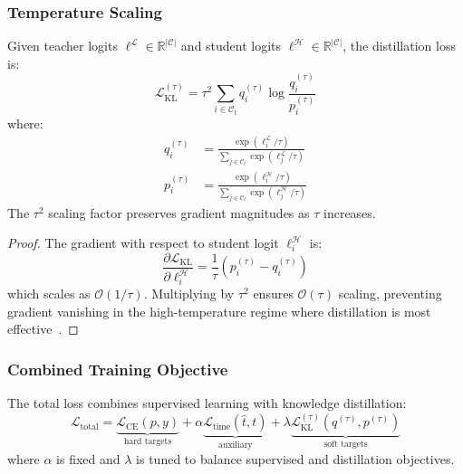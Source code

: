 \subsubsection{Temperature Scaling}

\begin{theorem}
    \label{thm:temp-scaling}
    Given teacher logits $\boldsymbol{\ell}^{\mathcal{L}} \in \mathbb{R}^{|\mathcal{C}|}$ and student logits $\boldsymbol{\ell}^{\mathcal{H}} \in \mathbb{R}^{|\mathcal{C}|}$, the distillation loss is:
    \begin{equation}
        \mathcal{L}_{\text{KL}}^{(\tau)} = \tau^2 \sum_{i \in \mathcal{C}_t} q_i^{(\tau)} \log \frac{q_i^{(\tau)}}{p_i^{(\tau)}}
        \label{eq:distill-loss}
    \end{equation}
    where:
    \begin{align}
        q_i^{(\tau)} & = \frac{\exp(\ell_i^{\mathcal{L}} / \tau)}{\sum_{j \in \mathcal{C}_t} \exp(\ell_j^{\mathcal{L}} / \tau)} \label{eq:teacher-dist} \\
        p_i^{(\tau)} & = \frac{\exp(\ell_i^{\mathcal{H}} / \tau)}{\sum_{j \in \mathcal{C}_t} \exp(\ell_j^{\mathcal{H}} / \tau)} \label{eq:student-dist}
    \end{align}
    The $\tau^2$ scaling factor preserves gradient magnitudes as $\tau$ increases.
\end{theorem}

\begin{proof}
    The gradient with respect to student logit $\ell_i^{\mathcal{H}}$ is:
    \begin{equation}
        \frac{\partial \mathcal{L}_{\text{KL}}}{\partial \ell_i^{\mathcal{H}}} = \frac{1}{\tau}(p_i^{(\tau)} - q_i^{(\tau)})
    \end{equation}
    which scales as $\mathcal{O}(1/\tau)$. Multiplying by $\tau^2$ ensures $\mathcal{O}(\tau)$ scaling, preventing gradient vanishing in the high-temperature regime where distillation is most effective~\cite{hintonDistillingKnowledgeNeural2015}.
\end{proof}

\subsubsection{Combined Training Objective}

The total loss combines supervised learning with knowledge distillation:
\begin{equation}
    \mathcal{L}_{\text{total}} = \underbrace{\mathcal{L}_{\text{CE}}(p, y)}_{\text{hard targets}} +
    \alpha \underbrace{\mathcal{L}_{\text{time}}(\hat{t}, t)}_{\text{auxiliary}} +
    \lambda \underbrace{\mathcal{L}_{\text{KL}}^{(\tau)}(q^{(\tau)}, p^{(\tau)})}_{\text{soft targets}}
    \label{eq:total-loss}
\end{equation}
where $\alpha$ is fixed and $\lambda$ is tuned to balance supervised and distillation objectives.


